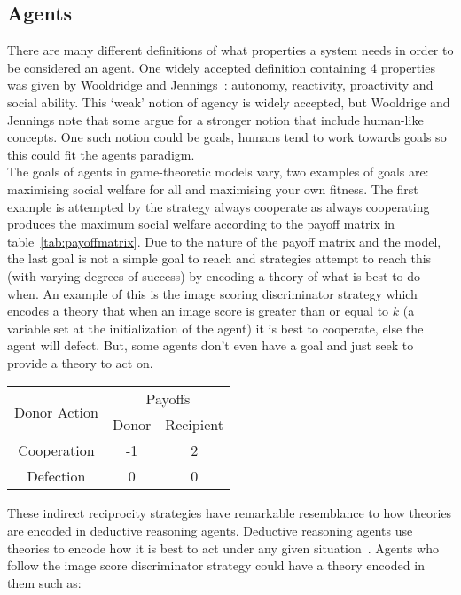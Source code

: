 \documentclass[twoside,twocolumn]{article}
\begin{document}
\subsection{Agents}
There are many different definitions of what properties a system needs in order to be considered an agent. One widely accepted definition containing 4 properties was given by Wooldridge and Jennings~\cite{wooldridge_jennings_1995}: autonomy, reactivity, proactivity and social ability. This `weak' notion of agency is widely accepted, but Wooldrige and Jennings note that some argue for a stronger notion that include human-like concepts. One such notion could be goals, humans tend to work towards goals so this could fit the agents paradigm.\\
The goals of agents in game-theoretic models vary, two examples of goals are: maximising social welfare for all and maximising your own fitness. The first example is attempted by the strategy always cooperate as always cooperating produces the maximum social welfare according to the payoff matrix in table~\ref{tab:payoffmatrix}. Due to the nature of the payoff matrix and the model, the last goal is not a simple goal to reach and strategies attempt to reach this (with varying degrees of success) by encoding a theory of what is best to do when. An example of this is the image scoring discriminator strategy which encodes a theory that when an image score is greater than or equal to $k$ (a variable set at the initialization of the agent) it is best to cooperate, else the agent will defect. But, some agents don't even have a goal and just seek to provide a theory to act on.
\begin{framed}
	\begin{center}
		\begin{tabular}{c|c|c}
		\multirow{2}{*}{Donor Action} & \multicolumn{2}{c}{Payoffs}\\		
		& Donor & Recipient\\
		\hline
		Cooperation & -1 & 2\\
		\hline
		Defection & 0 & 0\\
		\end{tabular}
		\label{tab:payoffmatrix}
	\end{center}	
\end{framed}
These indirect reciprocity strategies have remarkable resemblance to how theories are encoded in deductive reasoning agents. Deductive reasoning agents use theories to encode how it is best to act under any given situation~\cite{kostas_deductive}. Agents who follow the image score discriminator strategy could have a theory encoded in them such as:
\end{document}
